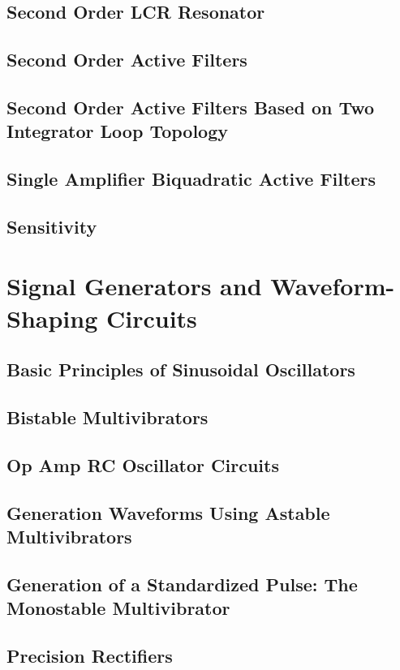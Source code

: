 \documentclass[11pt]{article}
\begin{document}
    \subsection{Second Order LCR Resonator}
    \subsection{Second Order Active Filters}
    \subsection{Second Order Active Filters Based on Two Integrator Loop Topology}
    \subsection{Single Amplifier Biquadratic Active Filters}
    \subsection{Sensitivity}


    \section{Signal Generators and Waveform-Shaping Circuits}
    \subsection{Basic Principles of Sinusoidal Oscillators}
    \subsection{Bistable Multivibrators}
    \subsection{Op Amp RC Oscillator Circuits}
    \subsection{Generation Waveforms Using Astable Multivibrators}
    \subsection{Generation of a Standardized Pulse: The Monostable Multivibrator}
    \subsection{Precision Rectifiers}

    
\end{document}
